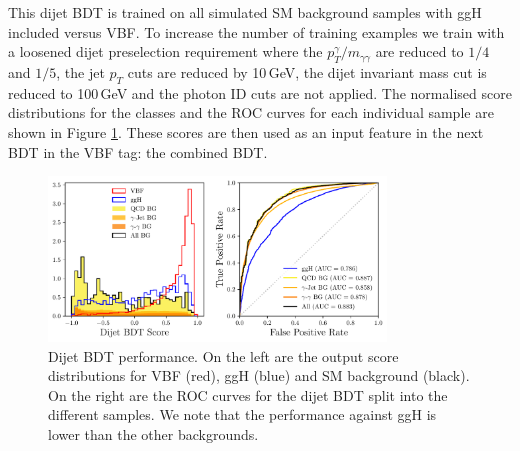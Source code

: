 This dijet BDT is trained on all simulated SM background samples with ggH included versus VBF. To increase the number of training examples we train with a loosened dijet preselection requirement where the $p_{T}^{\gamma}/m_{\gamma\gamma}$ are reduced to $1/4$ and $1/5$, the jet $p_T$ cuts are reduced by 10\,GeV, the dijet invariant mass cut is reduced to 100\,GeV and the photon ID cuts are not applied.
The normalised score distributions for the classes and the ROC curves for each individual sample are shown in Figure \ref{fig:event_categorisaton:dijet_bdt_performance}.
These scores are then used as an input feature in the next BDT in the VBF tag: the combined BDT. 
\begin{figure}[h!]
    \centering
        \includegraphics[width=0.8\textwidth]{figures/event_selection/dijet_BDT_PS.pdf}
    \caption{Dijet BDT performance. On the left are the output score distributions for VBF (red), ggH (blue) and SM background (black). On the right are the ROC curves for the dijet BDT split into the different samples. We note that the performance against ggH is lower than the other backgrounds.}
    \label{fig:event_categorisaton:dijet_bdt_performance}
\end{figure}









